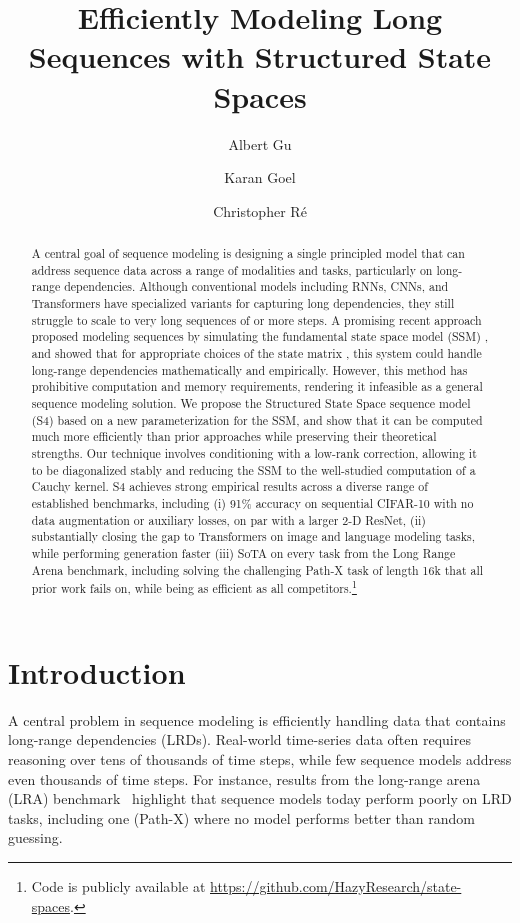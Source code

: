 \documentclass{article}
\title{Efficiently Modeling Long Sequences with Structured State Spaces}
\author[]{Albert Gu}
\author[]{Karan Goel}
\author[]{Christopher R{\'e}}
\affil[]{Department of Computer Science, Stanford University}
\affil[]{{\texttt{\{albertgu,krng\}@stanford.edu}, \texttt{chrismre@cs.stanford.edu}}}
\date{}
\newcommand{\methodabbrv}{S4}
\begin{document}
\maketitle

\begin{abstract}
  A central goal of sequence modeling is designing a single principled model that can address sequence data across a range of modalities and tasks, particularly on long-range dependencies.
  Although conventional models including RNNs, CNNs, and Transformers have specialized variants for capturing long dependencies, they still struggle to scale to very long sequences of  or more steps.
  A promising recent approach proposed modeling sequences by simulating the fundamental state space model (SSM) , and showed that for appropriate choices of the state matrix , this system could handle long-range dependencies mathematically and empirically.
  However, this method has prohibitive computation and memory requirements, rendering it infeasible as a general sequence modeling solution.
  We propose the Structured State Space sequence model (\methodabbrv{}) based on a new parameterization for the SSM, and show that it can be computed much more efficiently than prior approaches while preserving their theoretical strengths.
  Our technique involves conditioning  with a low-rank correction, allowing it to be diagonalized stably and reducing the SSM to the well-studied computation of a Cauchy kernel.
  \methodabbrv{} achieves strong empirical results across a diverse range of established benchmarks, including (i) 91\% accuracy on sequential CIFAR-10 with no data augmentation or auxiliary losses, on par with a larger 2-D ResNet, (ii) substantially closing the gap to Transformers on image and language modeling tasks, while performing generation  faster (iii) SoTA on every task from the Long Range Arena benchmark, including solving the challenging Path-X task of length 16k that all prior work fails on, while being as efficient as all competitors.\footnote{Code is publicly available at \url{https://github.com/HazyResearch/state-spaces}.}
\end{abstract}



\section{Introduction}
\label{sec:intro}


A central problem in sequence modeling is efficiently handling data that contains long-range dependencies (LRDs).
Real-world time-series data often requires reasoning over tens of thousands of time steps, while few sequence models address even thousands of time steps.
For instance, results from the long-range arena (LRA) benchmark~\citep{tay2021long} highlight that sequence models today perform poorly on LRD tasks,
including one (Path-X) where no model performs better than random guessing.
\end{document}

